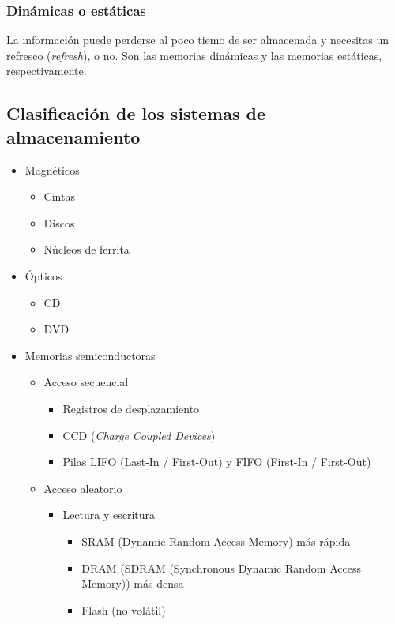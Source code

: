\documentclass[a4paper]{book}
\begin{document}
\subsubsection{Dinámicas o estáticas}
La información puede perderse al poco tiemo de ser almacenada y necesitas un refresco (\textit{refresh}), o no. Son las memorias dinámicas y las memorias estáticas, respectivamente.

\subsection{Clasificación de los sistemas de almacenamiento}
\begin{itemize}
	 \item Magnéticos
	 \begin{itemize}
		  \item Cintas
		  \item Discos
		  \item Núcleos de ferrita
	 \end{itemize}

	 \item Ópticos
	 \begin{itemize}
		  \item CD 
		  \item DVD
	 \end{itemize}

	 \item Memorias semiconductoras
	 \begin{itemize}
		  \item Acceso secuencial
		  \begin{itemize}
			   \item Registros de desplazamiento
			   \item CCD (\textit{Charge Coupled Devices})
			   \item Pilas LIFO (Last-In / First-Out) y FIFO (First-In / First-Out)
		  \end{itemize}

		  \item Acceso aleatorio
		  \begin{itemize}
			   \item Lectura y escritura
			   \begin{itemize}
					\item SRAM (Dynamic Random Access Memory) más rápida
					\item DRAM (SDRAM (Synchronous Dynamic Random Access Memory)) más densa
					\item Flash (no volátil)
			   \end{itemize}


\end{itemize}
\end{itemize}
\end{itemize}
\end{document}
